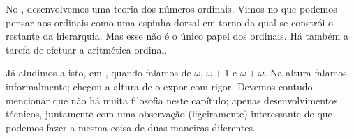 \documentclass[../../../include/open-logic-section]{subfiles}
\begin{document}


No , desenvolvemos uma teoria dos números ordinais.
Vimos no  que podemos pensar nos ordinais como uma
espinha dorsal em torno da qual se constrói o restante da hierarquia. Mas
esse não é o único papel dos ordinais. Há também a tarefa de
efetuar a aritmética ordinal.

Já aludimos a isto, em
, quando falamos de $\omega$,
$\omega+1$ e $\omega+\omega$. Na altura falamos informalmente; chegou
a altura de o expor com rigor. Devemos contudo mencionar
que não há muita filosofia neste capítulo; apenas desenvolvimentos
técnicos, juntamente com uma observação (ligeiramente) interessante de que
podemos fazer a mesma coisa de duas maneiras diferentes.
\end{document}
